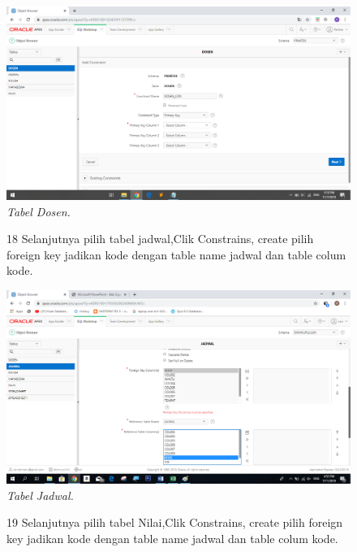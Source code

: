 \begin{enumerate}
\begin{figure}
    \begin{center}
    \includegraphics[scale=0.3]{figures/48.png}
    \caption{\textit{Tabel Dosen.}}
    \end{center}
    \label{gambar}
    \end{figure}

\begin{figure}
\item[18]Selanjutnya pilih tabel jadwal,Clik Constrains, create pilih foreign key jadikan kode dengan table name jadwal dan table colum kode.

    \begin{center}
    \includegraphics[scale=0.4]{figures/21.png}
    \caption{\textit{Tabel Jadwal.}}
    \end{center}
    \label{gambar}
    \end{figure}

\begin{figure}
\item[19] Selanjutnya pilih tabel Nilai,Clik Constrains, create pilih foreign key jadikan kode dengan table name jadwal dan table colum kode.


\end{figure}
\end{enumerate}
